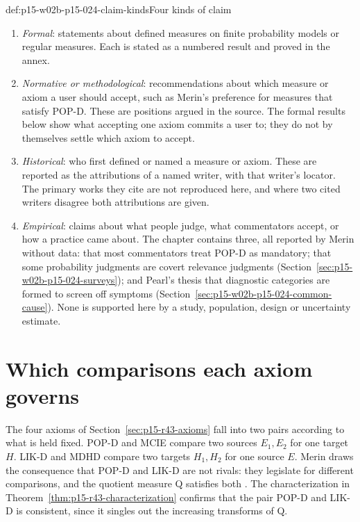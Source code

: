\begin{hbconvention}{def:p15-w02b-p15-024-claim-kinds}{Four kinds of claim}
\begin{enumerate}
\item \emph{Formal}: statements about defined measures on finite
  probability models or regular measures. Each is stated as a numbered
  result and proved in the annex.
\item \emph{Normative or methodological}: recommendations about which
  measure or axiom a user should accept, such as Merin's preference for
  measures that satisfy POP-D. These are positions argued in the source.
  The formal results below show what accepting one axiom commits a user
  to; they do not by themselves settle which axiom to accept.
\item \emph{Historical}: who first defined or named a measure or axiom.
  These are reported as the attributions of a named writer, with that
  writer's locator. The primary works they cite are not reproduced here,
  and where two cited writers disagree both attributions are given.
\item \emph{Empirical}: claims about what people judge, what
  commentators accept, or how a practice came about. The chapter
  contains three, all reported by Merin without data: that most
  commentators treat POP-D as mandatory; that some probability
  judgments are covert relevance judgments
  (Section~\ref{sec:p15-w02b-p15-024-surveys}); and Pearl's thesis that
  diagnostic categories are formed to screen off symptoms
  (Section~\ref{sec:p15-w02b-p15-024-common-cause}). None is supported
  here by a study, population, design or uncertainty estimate.
\end{enumerate}
\end{hbconvention}

\section{Which comparisons each axiom governs}
\label{sec:p15-w02b-p15-024-axiom-roles}

The four axioms of Section~\ref{sec:p15-r43-axioms} fall into two
pairs according to what is held fixed. POP-D and MCIE compare two
sources \(E_1,E_2\) for one target \(H\). LIK-D and MDHD compare two
targets \(H_1,H_2\) for one source \(E\). Merin draws the consequence
that POP-D and LIK-D are not rivals: they legislate for different
comparisons, and the quotient measure Q satisfies both
\cite[p.~271]{Merin2021Relevance}. The characterization in
Theorem~\ref{thm:p15-r43-characterization} confirms that the pair
POP-D and LIK-D is consistent, since it singles out the increasing
transforms of Q.

